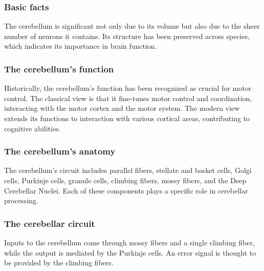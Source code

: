 \documentclass[11pt]{book} %
\begin{document}
\subsubsection{Basic facts}
The cerebellum is significant not only due to its volume but also due to the sheer number of neurons it contains. Its structure has been preserved across species, which indicates its importance in brain function.

\subsubsection{The cerebellum's function}
Historically, the cerebellum's function has been recognized as crucial for motor control. The classical view is that it fine-tunes motor control and coordination, interacting with the motor cortex and the motor system. The modern view extends its functions to interaction with various cortical areas, contributing to cognitive abilities.

\subsubsection{The cerebellum's anatomy}
The cerebellum's circuit includes parallel fibers, stellate and basket cells, Golgi cells, Purkinje cells, granule cells, climbing fibers, mossy fibers, and the Deep Cerebellar Nuclei. Each of these components plays a specific role in cerebellar processing.

\subsubsection{The cerebellar circuit}
Inputs to the cerebellum come through mossy fibers and a single climbing fiber, while the output is mediated by the Purkinje cells. An error signal is thought to be provided by the climbing fibers.
\end{document}

